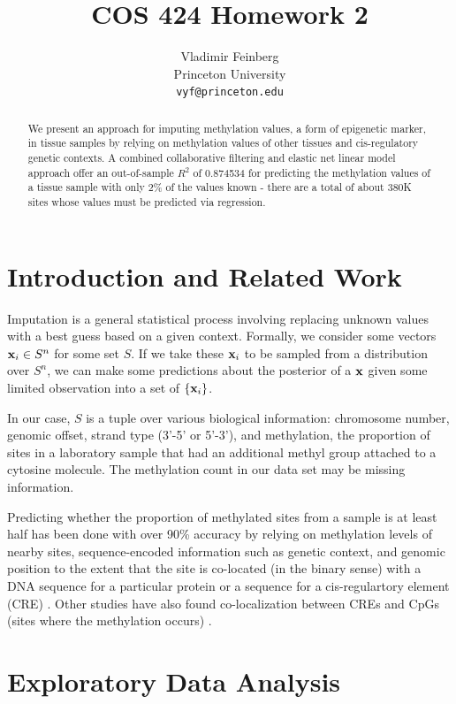 \documentclass{article} %
\title{COS 424 Homework 2}
\author{
Vladimir Feinberg\\
Princeton University\\
\texttt{vyf@princeton.edu}
}
\begin{document}
\maketitle

\begin{abstract}

We present an approach for imputing methylation values, a form of epigenetic marker, in tissue samples by relying on methylation values of other tissues and cis-regulatory genetic contexts. A combined collaborative filtering and elastic net linear model approach offer an out-of-sample $R^2$ of 0.874534 for predicting the methylation values of a tissue sample with only 2\% of the values known - there are a total of about 380K sites whose values must be predicted via regression.
\end{abstract}

\section{Introduction and Related Work}

Imputation is a general statistical process involving replacing unknown values with a best guess based on a given context. Formally, we consider some vectors $\textbf{x}_i\in S^n$ for some set $S$. If we take these $\textbf{x}_i$ to be sampled from a distribution over $S^n$, we can make some predictions about the posterior of a $\textbf{x}$ given some limited observation into a set of $\{\textbf{x}_i\}$.

In our case, $S$ is a tuple over various biological information: chromosome number, genomic offset, strand type (3'-5' or 5'-3'), and methylation, the proportion of sites in a laboratory sample that had an additional methyl group attached to a cytosine molecule. The methylation count in our data set may be missing information.

Predicting whether the proportion of methylated sites from a sample is at least half has been done with over 90\% accuracy by relying on methylation levels of nearby sites, sequence-encoded information such as genetic context, and genomic position to the extent that the site is co-located (in the binary sense) with a DNA sequence for a particular protein or a sequence for a cis-regulartory element (CRE) \cite{zhang2015predicting}. Other studies have also found co-localization between CREs and CpGs (sites where the methylation occurs) \cite{ziller2013charting}.

\section{Exploratory Data Analysis}
\end{document}

